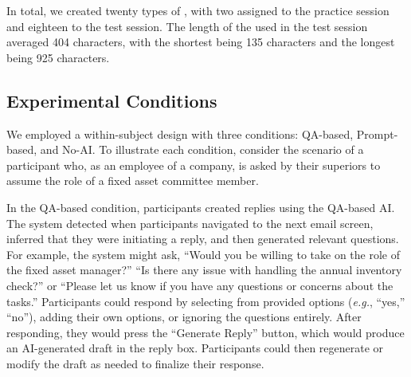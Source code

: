 In total, we created twenty types of , with two assigned to the practice session and eighteen to the test session.
The length of the  used in the test session averaged 404  characters, with the shortest being 135 characters and the longest being 925 characters.

\subsection{Experimental Conditions}
We employed a within-subject design with three conditions: QA-based, Prompt-based, and No-AI.
To illustrate each condition, consider the scenario of a participant who, as an employee of a company, is asked by their superiors to assume the role of a fixed asset committee member.

In the QA-based condition, participants created replies using the QA-based AI.
The system detected when participants navigated to the next email screen, inferred that they were initiating a reply, and then generated relevant questions.
For example, the system might ask, ``Would you be willing to take on the role of the fixed asset manager?'' ``Is there any issue with handling the annual inventory check?'' or ``Please let us know if you have any questions or concerns about the tasks.''
Participants could respond by selecting from provided options (\textit{e.g.}, ``yes,'' ``no''), adding their own options, or ignoring the questions entirely. 
After responding, they would press the ``Generate Reply'' button, which would produce an AI-generated draft in the reply box. 
Participants could then regenerate or modify the draft as needed to finalize their response.


